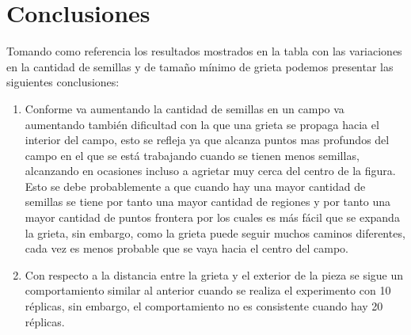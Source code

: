 \documentclass{article}
\begin{document}
\section{Conclusiones}
Tomando como referencia los resultados mostrados en la tabla con las variaciones en la cantidad de semillas y de tamaño mínimo de grieta podemos presentar las siguientes conclusiones:
\begin{enumerate}
\item Conforme va aumentando la cantidad de semillas en un campo va aumentando también dificultad con la que una grieta se propaga hacia el interior del campo, esto se refleja ya que alcanza puntos mas profundos del campo en el que se está trabajando cuando se tienen menos semillas, alcanzando en ocasiones incluso a agrietar muy cerca del centro de la figura. Esto se debe probablemente a que cuando hay una mayor cantidad de semillas se tiene por tanto una mayor cantidad de regiones y por tanto una mayor cantidad de puntos frontera por los cuales es más fácil que se expanda la grieta, sin embargo, como la grieta puede seguir muchos caminos diferentes, cada vez es menos probable que se vaya hacia el centro del campo.
\item Con respecto a la distancia entre la grieta y el exterior de la pieza se sigue un comportamiento similar al anterior cuando se realiza el experimento con 10 réplicas, sin embargo, el comportamiento no es consistente cuando hay 20 réplicas.

\end{enumerate}



\end{document}

